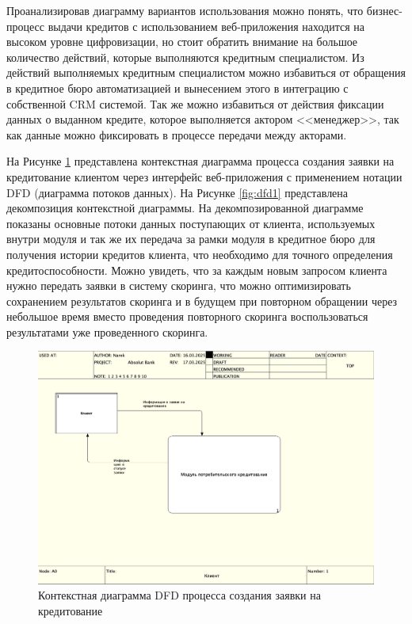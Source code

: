\documentclass[14pt, a4paper]{extarticle}
\begin{document}
Проанализировав диаграмму вариантов использования можно понять, что
бизнес-процесс выдачи кредитов с использованием веб-приложения находится на
высоком уровне цифровизации, но стоит обратить внимание на большое количество
действий, которые выполняются кредитным специалистом. Из действий выполняемых
кредитным специалистом можно избавиться от обращения в кредитное бюро
автоматизацией и вынесением этого в интеграцию с собственной CRM системой. Так
же можно избавиться от действия фиксации данных о выданном кредите, которое
выполняется актором <<менеджер>>, так как данные можно фиксировать в процессе
передачи между акторами.

На Рисунке \ref{fig:dfd0} представлена контекстная диаграмма
процесса создания заявки на кредитование клиентом через интерфейс
веб-приложения с применением нотации DFD (диаграмма потоков данных). На
Рисунке \ref{fig:dfd1} представлена декомпозиция контекстной диаграммы. На
декомпозированной диаграмме показаны основные потоки данных поступающих от
клиента, используемых внутри модуля и так же их передача за рамки модуля в
кредитное бюро для получения истории кредитов клиента, что необходимо для
точного определения кредитоспособности. Можно увидеть, что за каждым новым
запросом клиента нужно передать заявки в систему скоринга, что можно
оптимизировать сохранением результатов скоринга и в будущем при повторном
обращении через небольшое время вместо проведения повторного скоринга
воспользоваться результатами уже проведенного скоринга.

\begin{figure}[H]
	\centering
	\includegraphics[scale=0.33]{dfd0}
	\caption{Контекстная диаграмма DFD процесса создания заявки на кредитование}
	\label{fig:dfd0}
\end{figure}
\end{document}
